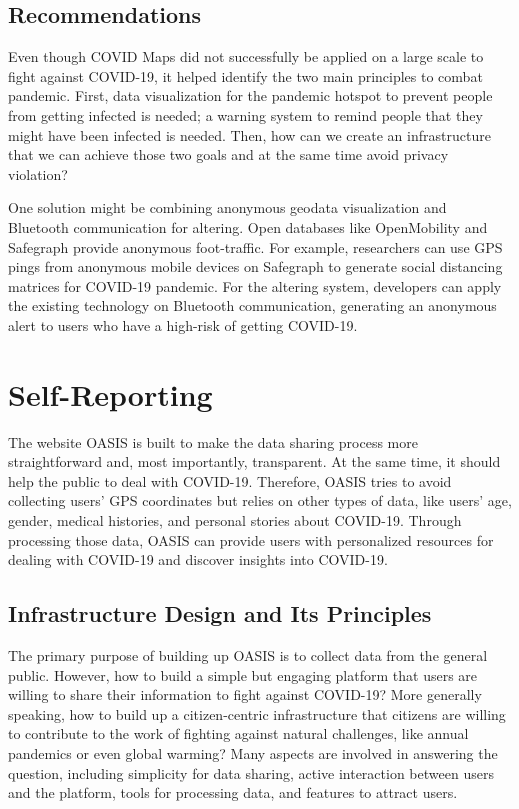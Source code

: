 \documentclass{ucsdreport}
\begin{document}
\subsection{Recommendations}
Even though COVID Maps did not successfully be applied on a large scale to 
fight against COVID-19, it helped identify the two main principles to combat 
pandemic. First, data visualization for the pandemic hotspot to prevent people
from getting infected is needed; a warning system to remind people that they
might have been infected is needed. Then, how can we create an infrastructure
that we can achieve those two goals and at the same time avoid privacy
violation?

One solution might be combining anonymous geodata visualization and 
Bluetooth communication for altering. Open databases like OpenMobility and 
Safegraph provide anonymous foot-traffic. For example, researchers can use GPS 
pings from anonymous mobile devices on Safegraph to generate social distancing 
matrices for COVID-19 pandemic. For the altering system, developers can 
apply the existing technology on Bluetooth communication, generating an
anonymous alert to users who have a high-risk of getting COVID-19. 


\newpage
\section{Self-Reporting}
The website OASIS is built to make the data sharing process more 
straightforward and, most importantly, transparent. At the same time, it should
help the public to deal with COVID-19. Therefore, OASIS tries to avoid 
collecting users' GPS coordinates but relies on other types of data, like users' 
age, gender, medical histories, and personal stories about COVID-19. Through 
processing those data, OASIS can provide users with personalized resources for
dealing with COVID-19 and discover insights into COVID-19.

\subsection{Infrastructure Design and Its Principles}
The primary purpose of building up OASIS is to collect data from the general 
public. However, how to build a simple but engaging platform that users are
willing to share their information to fight against COVID-19? More generally
speaking, how to build up a citizen-centric infrastructure that citizens are
willing to contribute to the work of fighting against natural challenges, like
annual pandemics or even global warming?  Many aspects are involved in answering
the question, including simplicity for data sharing, active interaction between
users and the platform, tools for processing data, and features to attract users. 
\end{document}
